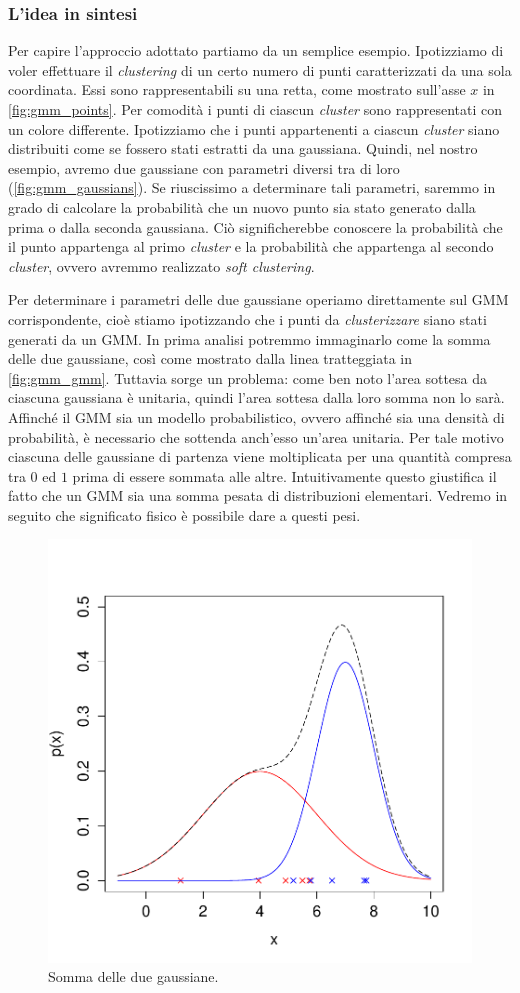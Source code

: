 \subsubsection{L'idea in sintesi}
Per capire l'approccio adottato partiamo da un semplice esempio. Ipotizziamo di voler effettuare il \emph{clustering} di un certo numero di punti caratterizzati da una sola coordinata. Essi sono rappresentabili su una retta, come mostrato sull'asse $x$ in \autoref{fig:gmm_points}. Per comodità i punti di ciascun \emph{cluster} sono rappresentati con un colore differente. Ipotizziamo che i punti appartenenti a ciascun \emph{cluster} siano distribuiti come se fossero stati estratti da una gaussiana. Quindi, nel nostro esempio, avremo due gaussiane con parametri diversi tra di loro (\autoref{fig:gmm_gaussians}). Se riuscissimo a determinare tali parametri, saremmo in grado di calcolare la probabilità che un nuovo punto sia stato generato dalla prima o dalla seconda gaussiana. Ciò significherebbe conoscere la probabilità che il punto appartenga al primo \emph{cluster} e la probabilità che appartenga al secondo \emph{cluster}, ovvero avremmo realizzato \emph{soft clustering}.

Per determinare i parametri delle due gaussiane operiamo direttamente sul GMM corrispondente, cioè stiamo ipotizzando che i punti da \emph{clusterizzare} siano stati generati da un GMM. In prima analisi potremmo immaginarlo come la somma delle due gaussiane, così come mostrato dalla linea tratteggiata in \autoref{fig:gmm_gmm}. Tuttavia sorge un problema: come ben noto l'area sottesa da ciascuna gaussiana è unitaria, quindi l'area sottesa dalla loro somma non lo sarà. Affinché il GMM sia un modello probabilistico, ovvero affinché sia una densità di probabilità, è necessario che sottenda anch'esso un'area unitaria. Per tale motivo ciascuna delle gaussiane di partenza viene moltiplicata per una quantità compresa tra $0$ ed $1$ prima di essere sommata alle altre. Intuitivamente questo giustifica il fatto che un GMM sia una somma pesata di distribuzioni elementari. Vedremo in seguito che significato fisico è possibile dare a questi pesi.

\begin{figure}[tbp]
\centering
  \includegraphics[width = 0.5\columnwidth]{images/gmm_gmm}
  \caption{Somma delle due gaussiane.}
  \label{fig:gmm_gmm}
\end{figure}



